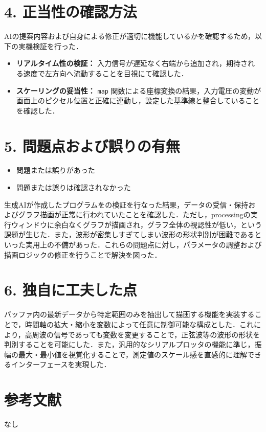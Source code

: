 \documentclass[uplatex]{jsarticle}
\begin{document}
\section*{4. 正当性の確認方法}
AIの提案内容および自身による修正が適切に機能しているかを確認するため，以下の実機検証を行った．
\begin{itemize}
	\item \textbf{リアルタイム性の検証：} 入力信号が遅延なく右端から追加され，期待される速度で左方向へ流動することを目視にて確認した．
	\item \textbf{スケーリングの妥当性：} \texttt{map} 関数による座標変換の結果，入力電圧の変動が画面上のピクセル位置と正確に連動し，設定した基準線と整合していることを確認した．
\end{itemize}

\section*{5. 問題点および誤りの有無}
\begin{itemize}
\renewcommand{\labelitemi}{}
  \item \Square 問題または誤りがあった
  \item \CheckedBox 問題または誤りは確認されなかった
\end{itemize}
生成AIが作成したプログラムをの検証を行なった結果，データの受信・保持およびグラフ描画が正常に行われていたことを確認した．ただし，processingの実行ウィンドウに余白なくグラフが描画され，グラフ全体の視認性が低い，という課題が生じた．また，波形が密集しすぎてしまい波形の形状判別が困難であるといった実用上の不備があった．これらの問題点に対し，パラメータの調整および描画ロジックの修正を行うことで解決を図った．

\section*{6. 独自に工夫した点}
バッファ内の最新データから特定範囲のみを抽出して描画する機能を実装することで，時間軸の拡大・縮小を変数によって任意に制御可能な構成とした．これにより，高周波の信号であっても変数を変更することで，正弦波等の波形の形状を判別することを可能にした．また，汎用的なシリアルプロッタの機能に準じ，振幅の最大・最小値を視覚化することで，測定値のスケール感を直感的に理解できるインターフェースを実現した．

\section*{参考文献}
なし
\end{document}
